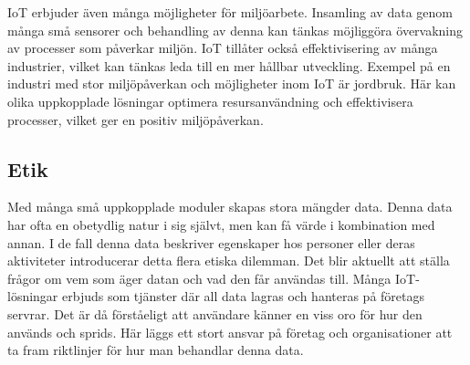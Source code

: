 IoT erbjuder även många möjligheter för miljöarbete. Insamling av data genom många små sensorer och behandling av denna kan tänkas möjliggöra övervakning av processer som påverkar miljön. IoT tillåter också effektivisering av många industrier, vilket kan tänkas leda till en mer hållbar utveckling. Exempel på en industri med stor miljöpåverkan och möjligheter inom IoT är jordbruk. Här kan olika uppkopplade lösningar optimera resursanvändning och effektivisera processer, vilket ger en positiv miljöpåverkan.\cite{IoT-agriculture}

\subsection{Etik}
Med många små uppkopplade moduler skapas stora mängder data. Denna data har ofta en obetydlig natur i sig självt, men kan få värde i kombination med annan. I de fall denna data beskriver egenskaper hos personer eller deras aktiviteter introducerar detta flera etiska dilemman. Det blir aktuellt att ställa frågor om vem som äger datan och vad den får användas till. Många IoT-lösningar erbjuds som tjänster där all data lagras och hanteras på företags servrar. Det är då förståeligt att användare känner en viss oro för hur den används och sprids. Här läggs ett stort ansvar på företag och organisationer att ta fram riktlinjer för hur man behandlar denna data.

%
